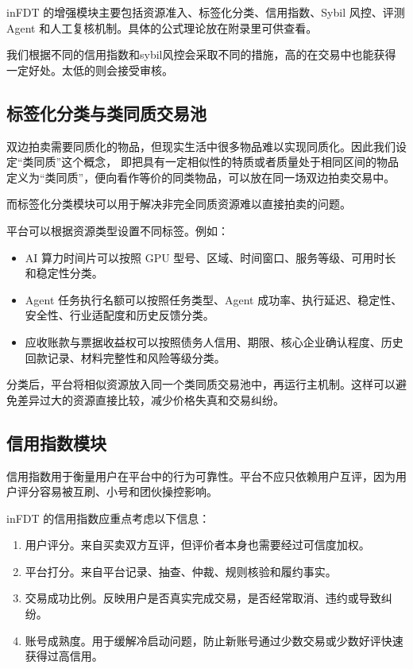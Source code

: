 \documentclass[UTF8,a4paper,12pt]{ctexart}
\begin{document}
inFDT 的增强模块主要包括资源准入、标签化分类、信用指数、Sybil 风控、评测 Agent 和人工复核机制。具体的公式理论放在附录里可供查看。

我们根据不同的信用指数和sybil风控会采取不同的措施，高的在交易中也能获得一定好处。太低的则会接受审核。


\subsection{标签化分类与类同质交易池}

双边拍卖需要同质化的物品，但现实生活中很多物品难以实现同质化。因此我们设定“类同质”这个概念，
即把具有一定相似性的特质或者质量处于相同区间的物品定义为“类同质”，便向看作等价的同类物品，可以放在同一场双边拍卖交易中。

而标签化分类模块可以用于解决非完全同质资源难以直接拍卖的问题。

平台可以根据资源类型设置不同标签。例如：

\begin{itemize}
    \item AI 算力时间片可以按照 GPU 型号、区域、时间窗口、服务等级、可用时长和稳定性分类。
    \item Agent 任务执行名额可以按照任务类型、Agent 成功率、执行延迟、稳定性、安全性、行业适配度和历史反馈分类。
    \item 应收账款与票据收益权可以按照债务人信用、期限、核心企业确认程度、历史回款记录、材料完整性和风险等级分类。
\end{itemize}

分类后，平台将相似资源放入同一个类同质交易池中，再运行主机制。这样可以避免差异过大的资源直接比较，减少价格失真和交易纠纷。



\subsection{信用指数模块}

信用指数用于衡量用户在平台中的行为可靠性。平台不应只依赖用户互评，因为用户评分容易被互刷、小号和团伙操控影响。

inFDT 的信用指数应重点考虑以下信息：

\begin{enumerate}
    \item 用户评分。来自买卖双方互评，但评价者本身也需要经过可信度加权。
    \item 平台打分。来自平台记录、抽查、仲裁、规则核验和履约事实。
    \item 交易成功比例。反映用户是否真实完成交易，是否经常取消、违约或导致纠纷。
    \item 账号成熟度。用于缓解冷启动问题，防止新账号通过少数交易或少数好评快速获得过高信用。
\end{enumerate}
\end{document}
